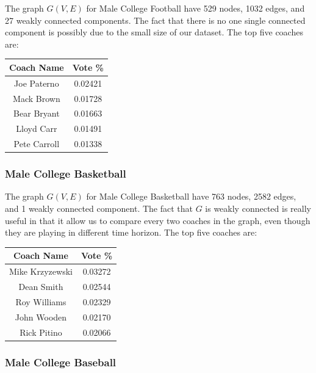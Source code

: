 \documentclass[titlepage,11pt]{article}
\begin{document}
\noindent The graph $G(V, E)$ for Male College Football have 529 nodes, 1032 edges, and 27 weakly connected components. The fact that there is no one single connected component is possibly due to the small size of our dataset. The top five coaches are:

\begin{center}
\begin{tabular}{ | c | c | }
\hline
Coach Name   & Vote \% \\\hline
Joe Paterno  & 0.02421 \\\hline
Mack Brown   & 0.01728 \\\hline
Bear Bryant  & 0.01663 \\\hline
Lloyd Carr   & 0.01491 \\\hline
Pete Carroll & 0.01338 \\
\hline
\end{tabular}
\end{center}

\subsubsection*{Male College Basketball}

\noindent The graph $G(V, E)$ for Male College Basketball have 763 nodes, 2582 edges, and 1 weakly connected component. The fact that $G$ is weakly connected is really useful in that it allow us to compare every two coaches in the graph, even though they are playing in different time horizon. The top five coaches are:

\begin{center}
\begin{tabular}{ | c | c | }
\hline
Coach Name  & Vote \% \\\hline
Mike Krzyzewski & 0.03272 \\\hline
Dean Smith  & 0.02544 \\\hline
Roy Williams & 0.02329 \\\hline
John Wooden  & 0.02170 \\\hline
Rick Pitino  & 0.02066 \\
\hline
\end{tabular}
\end{center}

\subsubsection*{Male College Baseball}
\end{document}
